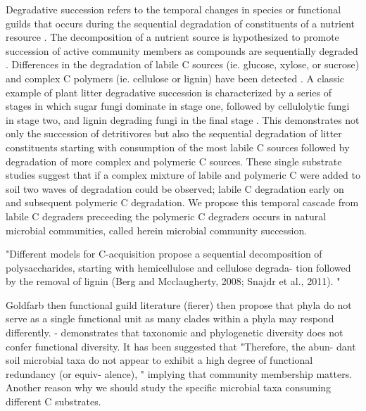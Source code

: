 Degradative succession refers to the temporal changes in species or functional guilds that occurs during the sequential degradation of constituents of a nutrient resource \cite{townsend2003essentials,Bastian_2009}.  The decomposition of a nutrient source is hypothesized to promote succession of active community members as compounds are sequentially degraded \cite{Biddanda_1988}.  Differences in the degradation of labile C sources (ie. glucose, xylose, or sucrose) and complex C polymers (ie. cellulose or lignin) have been detected \cite{Engelking_2007,Anderson_1973,Stotzky_1961,Alden_2001,Furukawa_1996,Fontaine_2003,Blagodatskaya_2007,Jenkins_2010,Rui_2009,Fierer_2010}. A classic example of plant litter degradative succession is characterized by a series of stages in which sugar fungi dominate in stage one, followed by cellulolytic fungi in stage two, and lignin degrading fungi in the final stage \cite{Gessner_2010}.  This demonstrates not only the succession of detritivores but also the sequential degradation of litter constituents starting with consumption of the most labile C sources followed by degradation of more complex and polymeric C sources. These single substrate studies suggest that if a complex mixture of labile and polymeric C were added to soil two waves of degradation could be observed; labile C degradation early on and subsequent polymeric C degradation.  We propose this temporal cascade from labile C degraders preceeding the polymeric C degraders occurs in natural microbial communities, called herein microbial community succession.  


"Different models for C-acquisition propose a sequential decomposition of polysaccharides, starting with hemicellulose and cellulose degrada- tion followed by the removal of lignin (Berg and Mcclaugherty, 2008; Snajdr et al., 2011). " \cite{Schneider_2012}  



Goldfarb then functional guild literature (fierer) then propose that phyla do not serve as a single functional unit as many clades within a phyla may respond differently.    
\cite{Fierer_2012} - demonstrates that taxonomic and phylogenetic diversity does not confer functional diversity.  
It has been suggested that "Therefore, the abun- dant soil microbial taxa do not appear to exhibit a high degree of functional redundancy (or equiv- alence), "\cite{Fierer_2013} implying that community membership matters.  Another reason why we should study the specific microbial taxa consuming different C substrates.  

